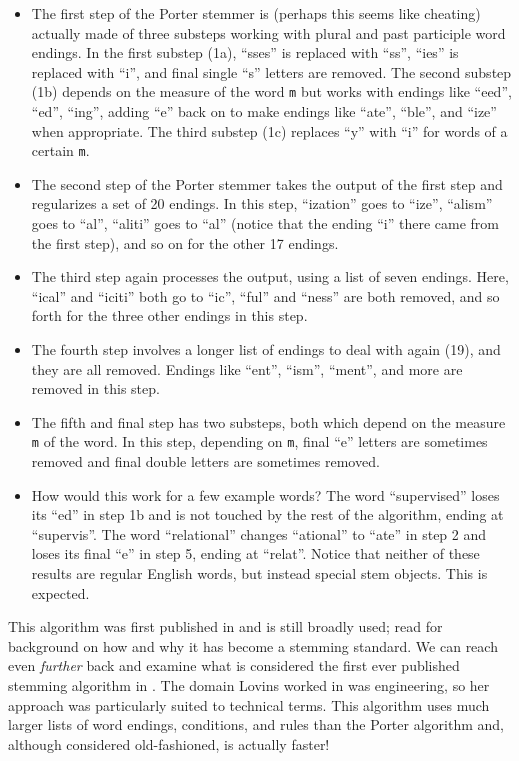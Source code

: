 \documentclass[
]{krantz}
\newenvironment{rmdblock}[1]
  {\begin{shaded*}
  \begin{itemize}[left = -1cm, labelsep = 1cm]
  \renewcommand{\labelitemi}{
    \raisebox{-.7\height}[0pt][0pt]{
      {\setkeys{Gin}{width=3em,keepaspectratio}\texttt{[image: images/\#1]}}
    }
  }
 
  \item
  }
  {
  \end{itemize}
  \end{shaded*}
  }
\newenvironment{rmdnote}
  {\begin{rmdblock}{note}}
  {\end{rmdblock}}
\begin{document}
\begin{itemize}
\item
  The first step of the Porter stemmer is (perhaps this seems like cheating) actually made of three substeps working with plural and past participle word endings. In the first substep (1a), ``sses'' is replaced with ``ss'', ``ies'' is replaced with ``i'', and final single ``s'' letters are removed. The second substep (1b) depends on the measure of the word \texttt{m} but works with endings like ``eed'', ``ed'', ``ing'', adding ``e'' back on to make endings like ``ate'', ``ble'', and ``ize'' when appropriate. The third substep (1c) replaces ``y'' with ``i'' for words of a certain \texttt{m}.
\item
  The second step of the Porter stemmer takes the output of the first step and regularizes a set of 20 endings. In this step, ``ization'' goes to ``ize'', ``alism'' goes to ``al'', ``aliti'' goes to ``al'' (notice that the ending ``i'' there came from the first step), and so on for the other 17 endings.
\item
  The third step again processes the output, using a list of seven endings. Here, ``ical'' and ``iciti'' both go to ``ic'', ``ful'' and ``ness'' are both removed, and so forth for the three other endings in this step.
\item
  The fourth step involves a longer list of endings to deal with again (19), and they are all removed. Endings like ``ent'', ``ism'', ``ment'', and more are removed in this step.
\item
  The fifth and final step has two substeps, both which depend on the measure \texttt{m} of the word. In this step, depending on \texttt{m}, final ``e'' letters are sometimes removed and final double letters are sometimes removed.
\end{itemize}

\begin{rmdnote}
How would this work for a few example words? The word ``supervised''
loses its ``ed'' in step 1b and is not touched by the rest of the
algorithm, ending at ``supervis''. The word ``relational'' changes
``ational'' to ``ate'' in step 2 and loses its final ``e'' in step 5,
ending at ``relat''. Notice that neither of these results are regular
English words, but instead special stem objects. This is expected.
\end{rmdnote}

This algorithm was first published in \citet{Porter80} and is still broadly used; read \citet{Willett06} for background on how and why it has become a stemming standard. We can reach even \emph{further} back and examine what is considered the first ever published stemming algorithm in \citet{Lovins68}. The domain Lovins worked in was engineering, so her approach was particularly suited to technical terms. This algorithm uses much larger lists of word endings, conditions, and rules than the Porter algorithm and, although considered old-fashioned, is actually faster!
\end{document}
